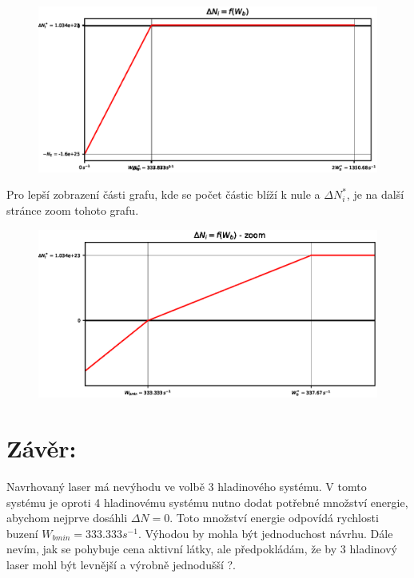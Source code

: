 \documentclass[10pt, a4paper]{article}%
\begin{document}
\begin{itemize}
    \begin{figure}[ht!]
        \centering
        \includegraphics[width=1\textwidth]{N_graph.eps}
    \end{figure}
Pro lepší zobrazení části grafu, kde se počet částic blíží k nule a $\Delta N_i^*$,
je na další stránce zoom tohoto grafu.
    \begin{figure}[ht!]
        \centering
        \includegraphics[width=1\textwidth]{N_graph_zoom.eps}
    \end{figure}
\end{itemize}

\section*{\Large Závěr:}
Navrhovaný laser má nevýhodu ve volbě 3 hladinového systému. V tomto systému je oproti 4 hladinovému
systému nutno dodat potřebné množství energie, abychom nejprve dosáhli $\Delta N = 0$. Toto množství energie
odpovídá rychlosti buzení $W_{bmin} = 333.333s^{-1}$. Výhodou by mohla být jednoduchost návrhu. Dále
nevím, jak se pohybuje cena aktivní látky, ale předpokládám, že by 3 hladinový laser mohl být levnější
a výrobně jednodušší ?.
\end{document}
